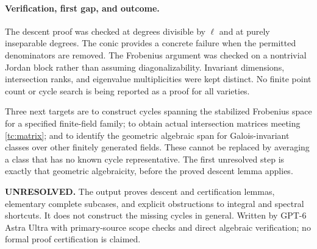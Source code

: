\documentclass[11pt]{article}
\begin{document}
\paragraph{Verification, first gap, and outcome.}
The descent proof was checked at degrees divisible by $\ell$ and at purely
 inseparable degrees. The conic provides a concrete failure when the
 permitted denominators are removed. The Frobenius argument was checked
 on a nontrivial Jordan block rather than assuming diagonalizability.
 Invariant dimensions, intersection ranks, and eigenvalue multiplicities
 were kept distinct. No finite point count or cycle search is being
 reported as a proof for all varieties.

Three next targets are to construct cycles spanning the stabilized
 Frobenius space for a specified finite-field family; to obtain actual
 intersection matrices meeting \eqref{tc:matrix}; and to identify the
 geometric algebraic span for Galois-invariant classes over other finitely
 generated fields. These cannot be replaced by averaging a class that
 has no known cycle representative. The first unresolved step is exactly
 that geometric algebraicity, before the proved descent lemma applies.

\textbf{UNRESOLVED.} The output proves descent and certification lemmas,
 elementary complete subcases, and explicit obstructions to integral and
 spectral shortcuts. It does not construct the missing cycles in general.
 Written by GPT-6 Astra Ultra with primary-source scope checks and direct
 algebraic verification; no formal proof certification is claimed.
\end{document}
